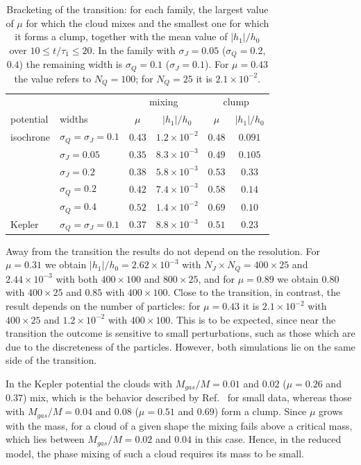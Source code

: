 \begin{table}[htp]
\begin{center}
\begin{tabular}{ll|cc|cc}
\hline\hline
 & & \multicolumn{2}{c|}{mixing} & \multicolumn{2}{c}{clump} \\
potential & widths & $\mu$ & $|h_1|/h_0$ & $\mu$ & $|h_1|/h_0$ \\
\hline
isochrone & $\sigma_Q = \sigma_J = 0.1$ & $0.43$ & $1.2\times 10^{-2}$ & $0.48$ & $0.091$ \\
 & $\sigma_J = 0.05$ & $0.35$ & $8.3\times 10^{-3}$ & $0.49$ & $0.105$ \\
 & $\sigma_J = 0.2$ & $0.38$ & $5.8\times 10^{-3}$ & $0.53$ & $0.33$ \\
 & $\sigma_Q = 0.2$ & $0.42$ & $7.4\times 10^{-3}$ & $0.58$ & $0.14$ \\
 & $\sigma_Q = 0.4$ & $0.52$ & $1.4\times 10^{-2}$ & $0.69$ & $0.10$ \\
Kepler & $\sigma_Q = \sigma_J = 0.1$ & $0.37$ & $8.8\times 10^{-3}$ & $0.51$ & $0.23$ \\
\hline\hline
\end{tabular}
\end{center}
\caption{Bracketing of the transition: for each family, the largest value of $\mu$ for which the cloud mixes and the smallest one for which it forms a clump, together with the mean value of $|h_1|/h_0$ over $10\leq t/\tau_1\leq 20$. In the family with $\sigma_J = 0.05$ ($\sigma_Q = 0.2$, $0.4$) the remaining width is $\sigma_Q = 0.1$ ($\sigma_J = 0.1$). For $\mu = 0.43$ the value refers to $N_Q = 100$; for $N_Q = 25$ it is $2.1\times 10^{-2}$.}
\label{Tab:Critical}
\end{table}

Away from the transition the results do not depend on the resolution. For $\mu = 0.31$ we obtain $|h_1|/h_0 = 2.62\times 10^{-3}$ with $N_J\times N_Q = 400\times 25$ and $2.44\times 10^{-3}$ with both $400\times 100$ and $800\times 25$, and for $\mu = 0.89$ we obtain $0.80$ with $400\times 25$ and $0.85$ with $400\times 100$. Close to the transition, in contrast, the result depends on the number of particles: for $\mu = 0.43$ it is $2.1\times 10^{-2}$ with $400\times 25$ and $1.2\times 10^{-2}$ with $400\times 100$. This is to be expected, since near the transition the outcome is sensitive to small perturbations, such as those which are due to the discreteness of the particles. However, both simulations lie on the same side of the transition.

In the Kepler potential the clouds with $M_{gas}/M = 0.01$ and $0.02$ ($\mu = 0.26$ and $0.37$) mix, which is the behavior described by Ref.~\cite{sCjL26} for small data, whereas those with $M_{gas}/M = 0.04$ and $0.08$ ($\mu = 0.51$ and $0.69$) form a clump. Since $\mu$ grows with the mass, for a cloud of a given shape the mixing fails above a critical mass, which lies between $M_{gas}/M = 0.02$ and $0.04$ in this case. Hence, in the reduced model, the phase mixing of such a cloud requires its mass to be small.


